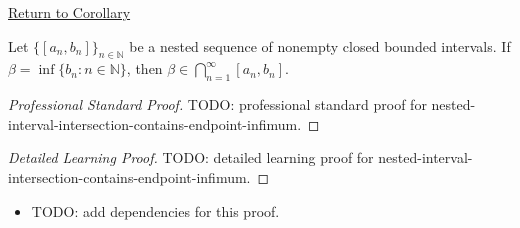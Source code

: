 \newpage
{}
\label{prf:nested-interval-intersection-contains-endpoint-infimum}

\begin{remark*}[Return]
\hyperref[cor:nested-interval-intersection-contains-endpoint-infimum]{Return to Corollary}
\end{remark*}

\begin{corollary*}
Let $\{[a_n,b_n]\}_{n\in\mathbb N}$ be a nested sequence of nonempty closed
bounded intervals. If $\beta=\inf\{b_n:n\in\mathbb N\}$, then
$\beta\in \bigcap_{n=1}^{\infty}[a_n,b_n]$.
\end{corollary*}

\begin{proof}[Professional Standard Proof]
\LRAProofBodyStart
TODO: professional standard proof for nested-interval-intersection-contains-endpoint-infimum.
\end{proof}

\begin{proof}[Detailed Learning Proof]
\LRAProofBodyStart
TODO: detailed learning proof for nested-interval-intersection-contains-endpoint-infimum.
\end{proof}

\begin{remark*}
\end{remark*}

\begin{dependencies}
\begin{itemize}
  \item TODO: add dependencies for this proof.
\end{itemize}
\end{dependencies}

\clearpage
